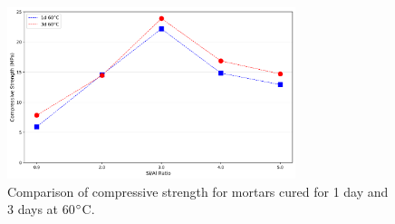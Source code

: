 
\begin{figure}[H]
  \centering
  \includegraphics[width=0.75\textwidth]{Cap4/images/compression_strength_comparison_1d_vs_3d.png}
  \caption{Comparison of compressive strength for mortars cured for 1 day and 3 days at 60$^{\circ}$C.}
  \label{fig:comparison_compression_strength}
\end{figure}